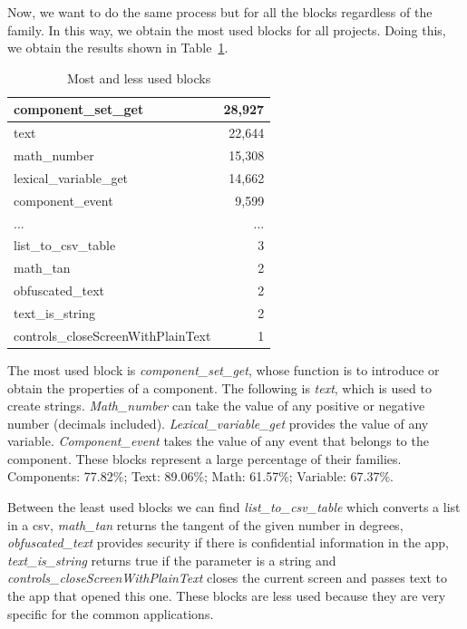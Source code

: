 \documentclass[a4paper]{article}
\begin{document}
Now, we want to do the same process but for all the blocks regardless of the family. In this way, we obtain the most used blocks for all projects. Doing this, we obtain the results shown in Table~\ref{tab:most-least}.

\begin{table}
\begin{center}
\caption{Most and less used blocks}
\bigskip
\label{tab:most-least}
\begin{tabular}{|l|r|}
\hline
component\_set\_get & 28,927\\ \hline
text & 22,644\\ \hline
math\_number & 15,308\\ \hline
lexical\_variable\_get & 14,662\\ \hline
component\_event & 9,599\\ \hline
... & ... \\ \hline
list\_to\_csv\_table & 3\\ \hline
math\_tan & 2\\ \hline
obfuscated\_text & 2\\ \hline
text\_is\_string & 2\\ \hline
controls\_closeScreenWithPlainText & 1\\ \hline
\end{tabular}
\end{center}
\end{table}

The most used block is \emph{component\_set\_get}, whose function is to introduce or obtain the properties of a component. The following is \emph{text}, which is used to create strings. \emph{Math\_number} can take the value of any positive or negative number (decimals included). \emph{Lexical\_variable\_get} provides the value of any variable. \emph{Component\_event} takes the value of any event that belongs to the component.
These blocks represent a large percentage of their families. Components: 77.82\%; Text: 89.06\%; Math: 61.57\%; Variable: 67.37\%.

Between the least used blocks we can find \emph{list\_to\_csv\_table} which converts a list in a csv, \emph{math\_tan} returns the tangent of the given number in degrees, \emph{obfuscated\_text} provides security if there is confidential information in the app, \emph{text\_is\_string} returns true if the parameter is a string and \emph{controls\_closeScreenWithPlainText} closes the current screen and passes text to the app that opened this one. These blocks are less used because they are very specific for the common applications.
\end{document}
